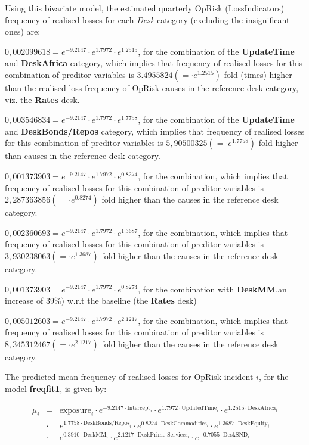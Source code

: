 \documentclass[]{article}
\begin{document}
\doublespacing
Using this bivariate model, the estimated quarterly OpRisk
(LossIndicators) frequency of realised losses for each \emph{Desk}
category (excluding the insignificant ones) are:

\begin{list}{*}{}
\item $0,002099618  = e^{-9.2147}\cdot e^{1.7972}\cdot e^{1.2515}$, for the combination of the \textbf{UpdateTime} and \textbf{DeskAfrica} category, which implies that frequency of realised losses for this combination of preditor variables is $3.4955824(=\cdot e^{1.2515})$ fold (times) higher than the realised loss frequency of OpRisk causes in the reference desk category, viz. the \textbf{Rates} desk. 
\item $0,003546834 = e^{-9.2147}\cdot e^{1.7972}\cdot e^{1.7758}$, for the combination of the \textbf{UpdateTime} and \textbf{DeskBonds/Repos} category, which implies that frequency of realised losses for this combination of preditor variables is $5,90500325(=\cdot e^{1.7758})$ fold higher than causes in the reference desk category.
\item $0,001373903 = e^{-9.2147}\cdot e^{1.7972}\cdot e^{0.8274}$, for the combination, which implies that frequency of realised losses for this combination of preditor variables is $2,287363856(=\cdot e^{0.8274})$ fold higher than the causes in the reference desk category.
\item $0,002360693= e^{-9.2147}\cdot e^{1.7972}\cdot e^{1.3687}$, for the combination, which implies that frequency of realised losses for this combination of preditor variables is $3,930238063(=\cdot e^{1.3687})$ fold higher than the causes in the reference desk category.
\item $0,001373903 = e^{-9.2147}\cdot e^{1.7972}\cdot e^{0.8274}$, for the combination with \textbf{DeskMM},an increase of $39\%)$ w.r.t the baseline (the \textbf{Rates} desk)
\item $0,005012603= e^{-9.2147}\cdot e^{1.7972}\cdot e^{2.1217}$, for the combination, which implies that frequency of realised losses for this combination of preditor variables is $8,345312467(=\cdot e^{2.1217})$ fold higher than the causes in the reference desk category.
\end{list}

The predicted mean frequency of realised losses for OpRisk incident
\(i\), for the model \textbf{freqfit1}, is given by:

\singlespacing

\begin{eqnarray}
\mu_{i}& = &\mbox{exposure}_i\cdot e^{-9.2147\cdot \mbox{Intercept}_i}\cdot e^{1.7972\cdot \mbox{UpdatedTime}_i}\cdot e^{1.2515\cdot \mbox{DeskAfrica}_i}\nonumber\\
&\cdot&e^{1.7758\cdot \mbox{DeskBonds/Repos}_i}\cdot e^{0.8274\cdot \mbox{DeskCommodities}_i}\cdot e^{1.3687\cdot \mbox{DeskEquity}_i}\nonumber\\
&\cdot& e^{0.3910\cdot \mbox{DeskMM}_i}\cdot e^{2.1217\cdot \mbox{DeskPrime Services}_i}\cdot e^{-0.7055\cdot \mbox{DeskSND}_i}
\end{eqnarray}
\end{document}
